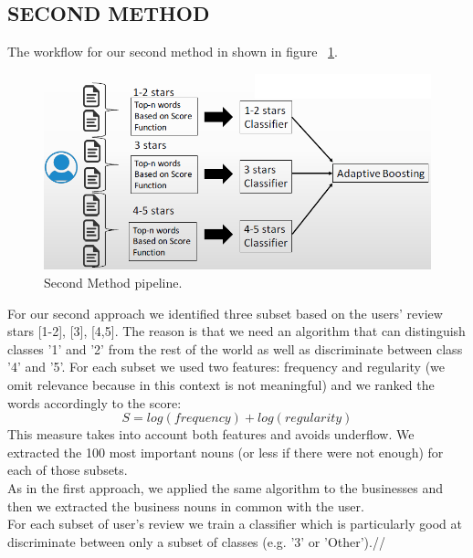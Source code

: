 \documentclass[11pt]{article}
\begin{document}
\subsection{SECOND METHOD}
The workflow for our second method in shown in figure ~\ref{second}.
\begin{figure}[thpb]
	\includegraphics[scale=0.35]{img/secondMethod.png}
	\caption{Second Method pipeline.}
	\label{second}
\end{figure}	
For our second approach we identified three subset based on the users' review stars [1-2], [3], [4,5]. The reason is that we need an algorithm that can distinguish classes '1' and '2' from the rest of the world as well as discriminate between class '4' and '5'. For each subset we used two features: frequency and regularity (we omit relevance because in this context is not meaningful) and we ranked the words accordingly to the score:\[ S=log(frequency)+log(regularity) \]
This measure takes into account both features and avoids underflow.
We extracted the 100 most important nouns (or less if there were not enough) for each of those subsets.\\
As in the first approach, we applied the same algorithm to the businesses and then we extracted the business nouns in common with the user.\\
For each subset of user's review we train a classifier which is particularly good at discriminate between only a subset of classes (e.g. '3' or 'Other').//
\end{document}
